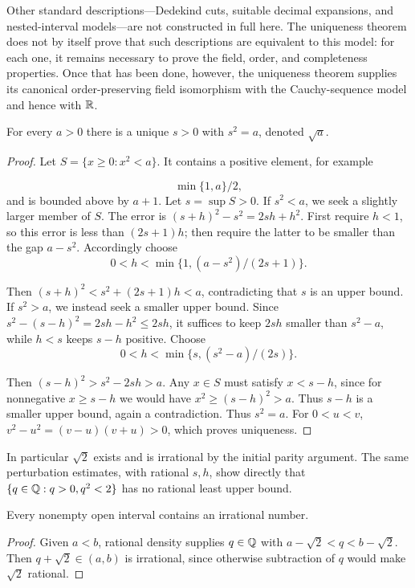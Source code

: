 Other standard descriptions---Dedekind cuts, suitable decimal expansions, and
nested-interval models---are not constructed in full here.  The uniqueness
theorem does not by itself prove that such descriptions are equivalent to
this model: for each one, it remains necessary to prove the field, order, and
completeness properties.  Once that has been done, however, the uniqueness
theorem supplies its canonical order-preserving field isomorphism with the
Cauchy-sequence model and hence with \(\mathbb{R}\).

\begin{proposition}
\label{prop:positive-square-roots}
For every $a>0$ there is a unique $s>0$ with $s^2=a$, denoted $\sqrt a$.
\end{proposition}
\begin{proof}
Let $S=\{x\geq0:x^2<a\}$. It contains a positive element, for example

\[
\min\{1,a\}/2,
\]
 and is bounded above by $a+1$. Let $s=\sup S>0$.
If $s^2<a$, we seek a slightly larger member of $S$. The error is
$(s+h)^2-s^2=2sh+h^2$. First require $h<1$, so this error is less than
$(2s+1)h$; then require the latter to be smaller than the gap $a-s^2$.
Accordingly choose
\[
0<h<\min\{1,(a-s^2)/(2s+1)\}.
\]

Then $(s+h)^2<s^2+(2s+1)h<a$, contradicting that $s$ is an upper bound.
If $s^2>a$, we instead seek a smaller upper bound. Since
$s^2-(s-h)^2=2sh-h^2\leq2sh$, it suffices to keep $2sh$ smaller
than $s^2-a$, while $h<s$ keeps $s-h$ positive. Choose
\[
0<h<\min\{s,(s^2-a)/(2s)\}.
\]

Then $(s-h)^2>s^2-2sh>a$. Any $x\in S$ must satisfy $x<s-h$,
since for nonnegative $x\geq s-h$ we would have $x^2\geq(s-h)^2>a$.
Thus $s-h$ is a smaller upper bound, again a contradiction. Thus $s^2=a$. For $0<u<v$, $v^2-u^2=(v-u)(v+u)>0$,
which proves uniqueness.
\end{proof}
In particular $\sqrt2$ exists and is irrational by the initial parity
argument. The same perturbation estimates, with rational $s,h$, show
directly that $\{q\in\mathbb{Q}:q>0,q^2<2\}$ has no rational least upper bound.

\begin{proposition}\label{prop:irrational-density}
Every nonempty open interval contains an irrational number.
\end{proposition}
\begin{proof}
Given $a<b$, rational density supplies $q\in\mathbb{Q}$ with
$a-\sqrt2<q<b-\sqrt2$. Then $q+\sqrt2\in(a,b)$ is irrational,
since otherwise subtraction of $q$ would make $\sqrt2$ rational.
\end{proof}

